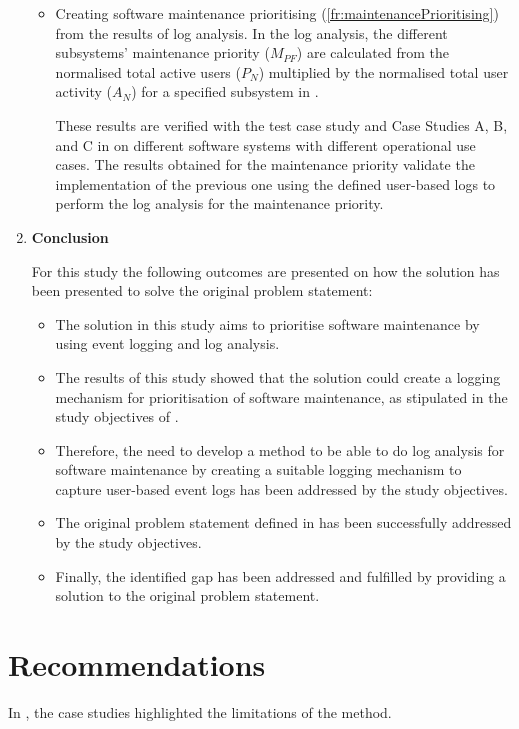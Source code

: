 \begin{enumerate}[label=\textbf{\Roman*.}]
\begin{itemize}
		\item Creating software maintenance prioritising (\ref{fr:maintenancePrioritising}) from the results of log analysis. In the log analysis, the different subsystems' maintenance priority ($M_{PF}$) are calculated from the normalised total active users ($P_N$) multiplied by the normalised total user activity ($A_N$) for a specified subsystem in .\par These results are verified with the test case study and Case Studies A, B, and C in  on different software systems with different operational use cases. The results obtained for the maintenance priority validate the implementation of the previous one using the defined user-based logs to perform the log analysis for the maintenance priority. 
	\end{itemize}

\item \textbf{Conclusion} \par For this study the following outcomes are presented on how the solution has been presented to solve the original problem statement:
	\begin{itemize}
		\item The solution in this study aims to prioritise software maintenance by using event logging and log analysis.
		\item The results of this study showed that the solution could create a logging mechanism for prioritisation of software maintenance, as stipulated in the study objectives of .
		\item Therefore, the need to develop a method to be able to do log analysis for software maintenance by creating a suitable logging mechanism to capture user-based event logs has been addressed by the study objectives.
		\item The original problem statement defined in  has been successfully addressed by the study objectives.
		\item Finally, the identified gap has been addressed and fulfilled by providing a solution to the original problem statement.
	\end{itemize}
\end{enumerate}

\section{Recommendations}
In , the case studies highlighted the limitations of the method. 

